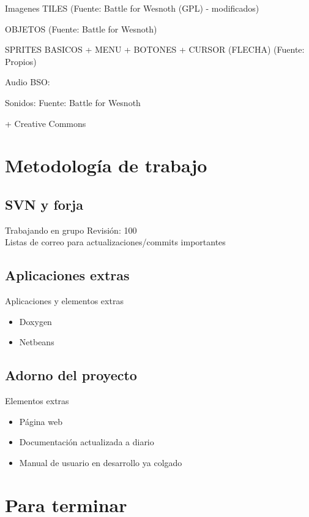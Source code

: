\documentclass[9pt,xcolor=svgnames]{beamer}
\begin{document}
  \begin{frame}{Imagenes}
   TILES (Fuente: Battle for Wesnoth (GPL) - modificados)
   
   OBJETOS (Fuente: Battle for Wesnoth)
   
   SPRITES BASICOS + MENU + BOTONES + CURSOR (FLECHA) (Fuente: Propios)
  \end{frame}
  
  \begin{frame}{Audio}
   BSO: 
   
   Sonidos: Fuente: Battle for Wesnoth
   
   + Creative Commons
  \end{frame}
  
  
 \section{Metodología de trabajo}
 
  \subsection{SVN y forja}
  
  \begin{frame}{Trabajando en grupo}
   Revisión: 100\\
   
   Listas de correo para actualizaciones/commits importantes
  \end{frame}
  
  
  
  \subsection{Aplicaciones extras}
  
  \begin{frame}{Aplicaciones y elementos extras}
   \begin{itemize}
    \item Doxygen
    \item Netbeans
   \end{itemize}
  \end{frame}
  

  \subsection{Adorno del proyecto}
  
  \begin{frame}{Elementos extras}
   \begin{itemize}
    \item Página web
    \item Documentación actualizada a diario
    \item Manual de usuario en desarrollo ya colgado
   \end{itemize}
  \end{frame}

 \section{Para terminar}
  

  
\end{document}
